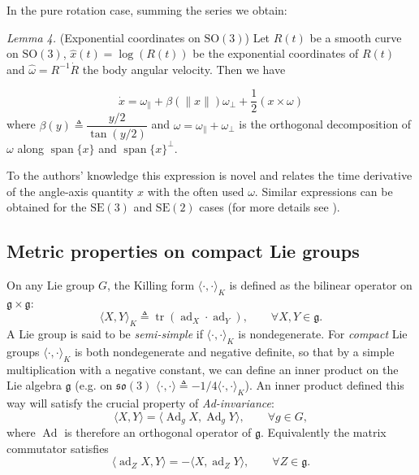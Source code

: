 \documentclass[10pt,twocolumn]{article}
\newcommand{\SO}{\mathrm{SO}}
\newcommand{\SE}{\mathrm{SE}}
\newcommand{\so}{\mathfrak{so}}
\newcommand{\gfrak}{\mathfrak g}
\newcommand{\Ad}{\operatorname{Ad}}
\newcommand{\ad}{\operatorname{ad}}
\newcommand{\tr}{\operatorname{tr}}
\newcounter{paperitem}
\newcommand{\paperhead}[3]{\refstepcounter{paperitem}\par\medskip\noindent\textit{#1}\label{#3} #2\par}
\begin{document}
In the pure rotation case, summing the series we obtain:

\paperhead{Lemma 4.}{(Exponential coordinates on $\SO(3)$) Let $R(t)$ be a smooth curve on $\SO(3)$, $\widehat{x}(t)=\log(R(t))$ be the exponential coordinates of $R(t)$ and $\widehat\omega=R^{-1}\dot R$ the body angular velocity. Then we have}{lem:so3-exponential-coordinates}
\begin{equation*}
\dot x=\omega_{\parallel}+\beta(\|x\|)\omega_{\perp}+\frac12(x\times\omega)
\end{equation*}
where $\beta(y)\triangleq\dfrac{y/2}{\tan(y/2)}$ and $\omega=\omega_{\parallel}+\omega_{\perp}$ is the orthogonal decomposition of $\omega$ along $\operatorname{span}\{x\}$ and $\operatorname{span}\{x\}^{\perp}$.

To the authors' knowledge this expression is novel and relates the time derivative of the angle-axis quantity $x$ with the often used $\omega$. Similar expressions can be obtained for the $\SE(3)$ and $\SE(2)$ cases (for more details see \cite{8}).

\subsection{Metric properties on compact Lie groups}\label{subsec:metric-compact}
On any Lie group $G$, the Killing form $\langle\cdot,\cdot\rangle_K$ is defined as the bilinear operator on $\gfrak\times\gfrak$:
\begin{equation*}
\langle X,Y\rangle_K\triangleq\tr(\ad_X\cdot\ad_Y),\qquad \forall X,Y\in\gfrak.
\end{equation*}
A Lie group is said to be \emph{semi-simple} if $\langle\cdot,\cdot\rangle_K$ is nondegenerate. For \emph{compact} Lie groups $\langle\cdot,\cdot\rangle_K$ is both nondegenerate and negative definite, so that by a simple multiplication with a negative constant, we can define an inner product on the Lie algebra $\gfrak$ (e.g. on $\so(3)$ $\langle\cdot,\cdot\rangle\triangleq-1/4\langle\cdot,\cdot\rangle_K$). An inner product defined this way will satisfy the crucial property of \emph{Ad-invariance}:
\begin{equation*}
\langle X,Y\rangle=\langle\Ad_gX,\Ad_gY\rangle,\qquad \forall g\in G,
\end{equation*}
where $\Ad$ is therefore an orthogonal operator of $\gfrak$. Equivalently the matrix commutator satisfies
\begin{equation*}
\langle\ad_ZX,Y\rangle=-\langle X,\ad_ZY\rangle,
\qquad \forall Z\in\gfrak.\tag{2}\label{eq:2}
\end{equation*}
\end{document}

